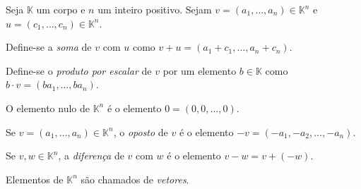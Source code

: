 \begin{definition}
    Seja $\mathbb K$ um corpo e $n$ um inteiro positivo. Sejam $v=(a_1, \dots, a_n)\in \mathbb K^n$ e $u=(c_1, \dots, c_n)\in \mathbb K^n$.

    Define-se a \emph{soma} de $v$ com $u$ como $v+u=(a_1+c_1, \dots, a_n+c_n)$.

    Define-se o \emph{produto por escalar} de $v$ por um elemento $b\in \mathbb K$ como $b\cdot v=(ba_1, \dots, ba_n)$.

    O elemento nulo de $\mathbb K^n$ é o elemento $0=(0, 0, \dots, 0)$.

    Se $v=(a_1, \dots, a_n)\in \mathbb K^n$, o \emph{oposto} de $v$ é o elemento $-v=(-a_1, -a_2, \dots, -a_n)$.

    Se $v, w \in \mathbb K^n$, a \emph{diferença} de $v$ com $w$ é o elemento $v-w=v+(-w)$.

    Elementos de $\mathbb K^n$ são chamados de \emph{vetores}.
\end{definition}

